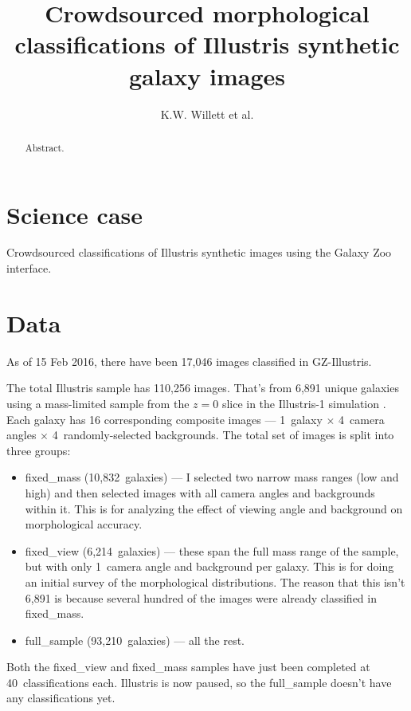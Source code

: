 \documentclass[iop,apj,tighten]{emulateapj}
\begin{document}
\title{Crowdsourced morphological classifications of Illustris synthetic galaxy images}
\author{K.W. Willett et al.}

\begin{abstract}
Abstract.
\end{abstract}

\maketitle

\section{Science case}

Crowdsourced classifications of Illustris synthetic images \citep{sny15,tor15} using the Galaxy Zoo \citep{lin08,wil13} interface. 

\section{Data}

As of 15 Feb 2016, there have been 17,046 images classified in GZ-Illustris. 

The total Illustris sample has 110,256 images. That's from 6,891 unique galaxies using a mass-limited sample from the $z=0$ slice in the Illustris-1 simulation \citep{vog14a}. Each galaxy has 16 corresponding composite images --- 1~galaxy $\times$ 4~camera angles $\times$ 4~randomly-selected backgrounds. The total set of images is split into three groups:

\begin{itemize}

\item fixed\_mass (10,832~galaxies) --- I selected two narrow mass ranges (low and high) and then selected images with all camera angles and backgrounds within it. This is for analyzing the effect of viewing angle and background on morphological accuracy.
\item fixed\_view (6,214~galaxies) --- these span the full mass range of the sample, but with only 1~camera angle and background per galaxy. This is for doing an initial survey of the morphological distributions. The reason that this isn't 6,891 is because several hundred of the images were already classified in fixed\_mass.
\item full\_sample (93,210~galaxies) --- all the rest.

\end{itemize}
Both the fixed\_view and fixed\_mass samples have just been completed at 40~classifications each. Illustris is now paused, so the full\_sample doesn't have any classifications yet. 
\end{document}
